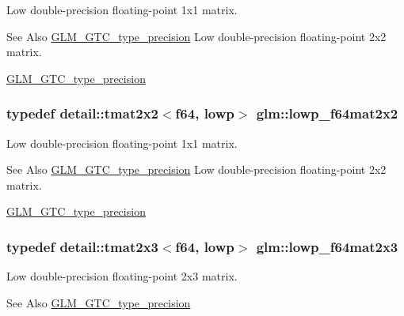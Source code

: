 Low double-\/precision floating-\/point 1x1 matrix. \begin{DoxySeeAlso}{See Also}
\hyperlink{group__gtc__type__precision}{G\-L\-M\-\_\-\-G\-T\-C\-\_\-type\-\_\-precision} Low double-\/precision floating-\/point 2x2 matrix. 

\hyperlink{group__gtc__type__precision}{G\-L\-M\-\_\-\-G\-T\-C\-\_\-type\-\_\-precision} 
\end{DoxySeeAlso}
\hypertarget{group__gtc__type__precision_ga38e41c5332b4eb20b23b4ed1f06608d4}{
\subsubsection[{lowp\-\_\-f64mat2x2}]{\setlength{\rightskip}{0pt plus 5cm}typedef detail\-::tmat2x2$<$f64, lowp$>$ {\bf glm\-::lowp\-\_\-f64mat2x2}}}\label{group__gtc__type__precision_ga38e41c5332b4eb20b23b4ed1f06608d4}
Low double-\/precision floating-\/point 1x1 matrix. \begin{DoxySeeAlso}{See Also}
\hyperlink{group__gtc__type__precision}{G\-L\-M\-\_\-\-G\-T\-C\-\_\-type\-\_\-precision} Low double-\/precision floating-\/point 2x2 matrix. 

\hyperlink{group__gtc__type__precision}{G\-L\-M\-\_\-\-G\-T\-C\-\_\-type\-\_\-precision} 
\end{DoxySeeAlso}
\hypertarget{group__gtc__type__precision_ga2add7d48faba102f53fbad2e14dfed12}{
\subsubsection[{lowp\-\_\-f64mat2x3}]{\setlength{\rightskip}{0pt plus 5cm}typedef detail\-::tmat2x3$<$f64, lowp$>$ {\bf glm\-::lowp\-\_\-f64mat2x3}}}\label{group__gtc__type__precision_ga2add7d48faba102f53fbad2e14dfed12}
Low double-\/precision floating-\/point 2x3 matrix. \begin{DoxySeeAlso}{See Also}
\hyperlink{group__gtc__type__precision}{G\-L\-M\-\_\-\-G\-T\-C\-\_\-type\-\_\-precision} 
\end{DoxySeeAlso}
